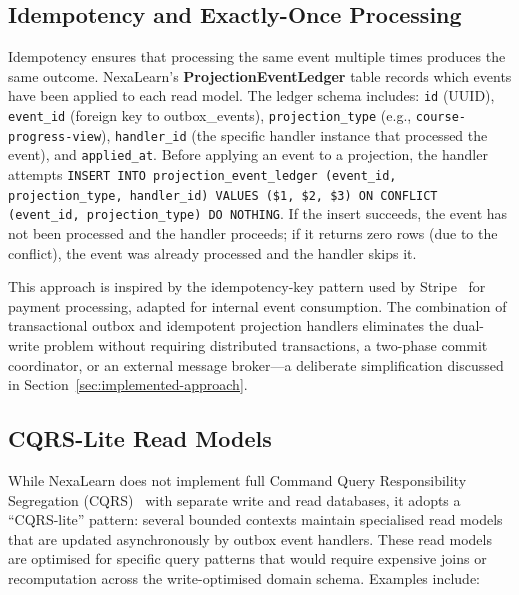 \subsection{Idempotency and Exactly-Once Processing}

Idempotency ensures that processing the same event multiple times produces the same outcome. NexaLearn's \textbf{ProjectionEventLedger} table records which events have been applied to each read model. The ledger schema includes: \texttt{id} (UUID), \texttt{event\_id} (foreign key to outbox\_events), \texttt{projection\_type} (e.g., \texttt{course-progress-view}), \texttt{handler\_id} (the specific handler instance that processed the event), and \texttt{applied\_at}. Before applying an event to a projection, the handler attempts \texttt{INSERT INTO projection\_event\_ledger (event\_id, projection\_type, handler\_id) VALUES (\$1, \$2, \$3) ON CONFLICT (event\_id, projection\_type) DO NOTHING}. If the insert succeeds, the event has not been processed and the handler proceeds; if it returns zero rows (due to the conflict), the event was already processed and the handler skips it.

This approach is inspired by the idempotency-key pattern used by Stripe~\cite{stripe2024api} for payment processing, adapted for internal event consumption. The combination of transactional outbox and idempotent projection handlers eliminates the dual-write problem without requiring distributed transactions, a two-phase commit coordinator, or an external message broker---a deliberate simplification discussed in Section~\ref{sec:implemented-approach}.

\subsection{CQRS-Lite Read Models}

While NexaLearn does not implement full Command Query Responsibility Segregation (CQRS)~\cite{fowler2011cqrs} with separate write and read databases, it adopts a ``CQRS-lite'' pattern: several bounded contexts maintain specialised read models that are updated asynchronously by outbox event handlers. These read models are optimised for specific query patterns that would require expensive joins or recomputation across the write-optimised domain schema. Examples include:

